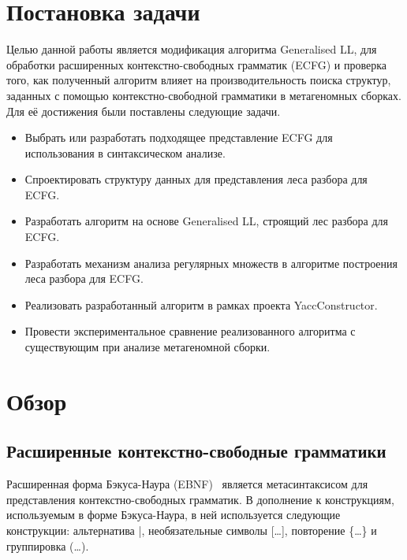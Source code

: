 \documentclass[14pt]{matmex-diploma-custom}
\begin{document}
	\section{Постановка задачи}
	
	Целью данной работы является модификация алгоритма Generalised LL, для обработки
	расширенных контекстно-свободных грамматик (ECFG) и проверка того, как полученный 
	алгоритм влияет на производительность поиска структур, заданных с помощью 
	контекстно-свободной грамматики в метагеномных сборках. Для её достижения были 
	поставлены следующие задачи.
	
	\begin{itemize}  
		\item Выбрать или разработать подходящее представление ECFG для использования в синтаксическом анализе.
		\item Спроектировать структуру данных для представления леса разбора для ECFG.
		\item Разработать алгоритм на основе Generalised LL, строящий лес разбора для ECFG.
        \item Разработать механизм анализа регулярных множеств в алгоритме построения леса разбора для ECFG.
		\item Реализовать разработанный алгоритм в рамках проекта YaccConstructor.
		\item Провести экспериментальное сравнение реализованного алгоритма с существующим при анализе метагеномной сборки.
	\end{itemize}
	
	\section{Обзор}
	
	\subsection{Расширенные контекстно-свободные грамматики}
	
	Расширенная форма Бэкуса-Наура (EBNF)~\cite{EBNFISO} является метасинтаксисом для представления 
	контекстно-свободных грамматик. В дополнение к конструкциям, используемым в форме
	Бэкуса-Наура, в ней используется следующие конструкции: альтернатива |,
	необязательные символы [\dots], повторение \{\dots\} и группировка (\dots).
	
\end{document}

